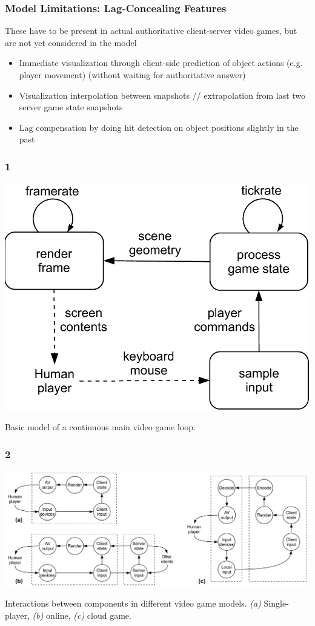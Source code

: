 \documentclass{UDEbeamerEN}
\begin{document}
\begin{frame}
	\frametitle{Model Limitations: Lag-Concealing Features}
		These have to be present in actual authoritative client-server video games, but are not yet considered in the model
	\begin{itemize}
		\item Immediate visualization through client-side prediction of object actions (e.g. player movement) (without waiting for authoritative answer)
		\item Visualization interpolation between snapshots // extrapolation from last two server game state snapshots
		\item Lag compensation by doing hit detection on object positions slightly in the past
	\end{itemize}
\end{frame}


\begin{frame}
	\frametitle{1}

	\begin{center}
		\includegraphics[width=.5\textwidth]{../../../models/game_loop.pdf}

		Basic model of a continuous main video game loop.
	\end{center}

\end{frame}

\begin{frame}
	\frametitle{2}

	\begin{center}

		\includegraphics[width=1.0\textwidth]{../../../models/component_interaction_full.pdf}

		Interactions between components in different video game models. \textit{(a)} Single-player, \textit{(b)} online, \textit{(c)} cloud game.
	\end{center}

\end{frame}
\end{document}

